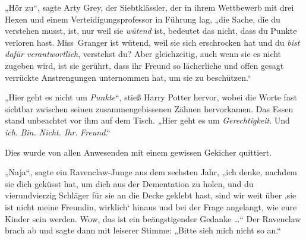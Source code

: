 „Hör zu“, sagte Arty Grey, der Siebtklässler, der in ihrem Wettbewerb mit drei Hexen und einem Verteidigungsprofessor in Führung lag, „die Sache, die du verstehen musst, ist, nur weil sie \emph{wütend} ist, bedeutet das nicht, dass du Punkte verloren hast. Miss~Granger ist wütend, weil sie sich erschrocken hat und du \emph{bist dafür verantwortlich}, verstehst du? Aber gleichzeitig, auch wenn sie es nicht zugeben wird, ist sie gerührt, dass ihr Freund so lächerliche und offen gesagt verrückte Anstrengungen unternommen hat, um sie zu beschützen.“

„Hier geht es nicht um \emph{Punkte}“, stieß Harry Potter hervor, wobei die Worte fast sichtbar zwischen seinen zusammengebissenen Zähnen hervorkamen. Das Essen stand unbeachtet vor ihm auf dem Tisch.
„Hier geht es um \emph{Gerechtigkeit}. Und \emph{ich}. \emph{Bin. Nicht. Ihr}. \emph{Freund}.“

Dies wurde von allen Anwesenden mit einem gewissen Gekicher quittiert.

„Naja“, sagte ein Ravenclaw-Junge aus dem sechsten Jahr, „ich denke, nachdem sie dich geküsst hat, um dich aus der Dementation zu holen, und du vierundvierzig Schläger für sie an die Decke geklebt hast, sind wir weit über ‚sie ist nicht meine Freundin, wirklich‘ hinaus und bei der Frage angelangt, wie eure Kinder sein werden. Wow, das ist ein beängstigender Gedanke …“ Der Ravenclaw brach ab und sagte dann mit leiserer Stimme:
„Bitte sieh mich nicht so an.“

